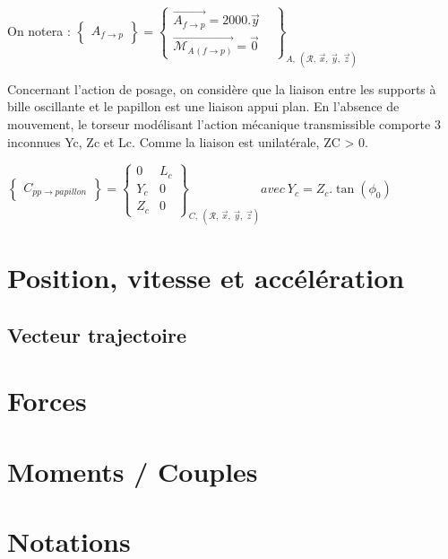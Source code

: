 \documentclass[
	11pt, %
	fleqn, %
	a4paper, %
]{LegrandOrangeBook}
\begin{document}
\begin{Extrait}
\begin{minipage}{0.4\textwidth}
\end{minipage}


On notera :
$\displaystyle \begin{Bmatrix}
A_{f\rightarrow p}
\end{Bmatrix} =\begin{Bmatrix}
\overrightarrow{A_{f\rightarrow p}} =2000.\vec{y} & \\
\overrightarrow{\mathcal{M}_{A}{}_{\left( f\rightarrow p\right)}} =\vec{0} & 
\end{Bmatrix}_{A,\ (\mathcal{R} ,\ \vec{x} ,\ \vec{y} ,\ \vec{z})}$

Concernant l’action de posage, on considère que la liaison entre les supports à bille
oscillante et le papillon est une liaison appui plan. En l’absence de mouvement, le
torseur modélisant l’action mécanique transmissible comporte 3 inconnues Yc, Zc et Lc.
Comme la liaison est unilatérale, ZC > 0.

$\displaystyle \begin{Bmatrix}
C_{pp\rightarrow papillon}
\end{Bmatrix} =\begin{Bmatrix}
0 & L_{c}\\
Y_{c} & 0\\
Z_{c} & 0
\end{Bmatrix}_{C,\ (\mathcal{R} ,\ \vec{x} ,\ \vec{y} ,\ \vec{z})} avec\ Y_{c} =Z_{c} .\tan( \phi_{0})$


\end{Extrait}






\section{Position, vitesse et accélération}
\subsection{Vecteur trajectoire}

\section{Forces}

\section{Moments / Couples}

\section{Notations}
\end{document}
